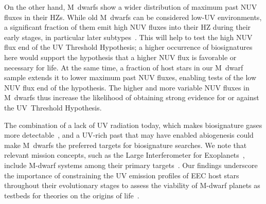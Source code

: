 \documentclass[twocolumn,twocolappendix,linenumbers]{aastex631}
\begin{document}
On the other hand, M~dwarfs show a wider distribution of maximum past \gls{NUV} fluxes in their \glspl{HZ}.
While old M~dwarfs can be considered low-UV environments, a significant fraction of them emit high \gls{NUV} fluxes into their \gls{HZ} during their early stages, in particular later subtypes~\citep{Richey-Yowell2023}.
This will help to test the high \gls{NUV} flux end of the UV Threshold Hypothesis; a higher occurrence of biosignatures here would support the hypothesis that a higher NUV flux is favorable or necessary for life.
At the same time, a fraction of host stars in our M~dwarf sample extends it to lower maximum past \gls{NUV} fluxes, enabling tests of the low \gls{NUV} flux end of the hypothesis.
The higher and more variable \gls{NUV} fluxes in M~dwarfs thus increase the likelihood of obtaining strong evidence for or against the UV~Threshold Hypothesis.

The combination of a lack of \gls{UV} radiation today, which makes biosignature gases more detectable~\citep{Segura2005}, and a UV-rich past that may have enabled abiogenesis could make M~dwarfs the preferred targets for biosignature searches.
We note that relevant mission concepts, such as the Large Interferometer for Exoplanets~\citep[\life,][]{Quanz2022,Glauser2024}, include M-dwarf systems among their primary targets~\citep{Kammerer2018,Carrion-Gonzalez2023}.
Our findings underscore the importance of constraining the \gls{UV} emission profiles of \gls{EEC} host stars throughout their evolutionary stages to assess the viability of M-dwarf planets as testbeds for theories on the origins of life~\citep{Rimmer2021,Ranjan2023a}.
\end{document}
